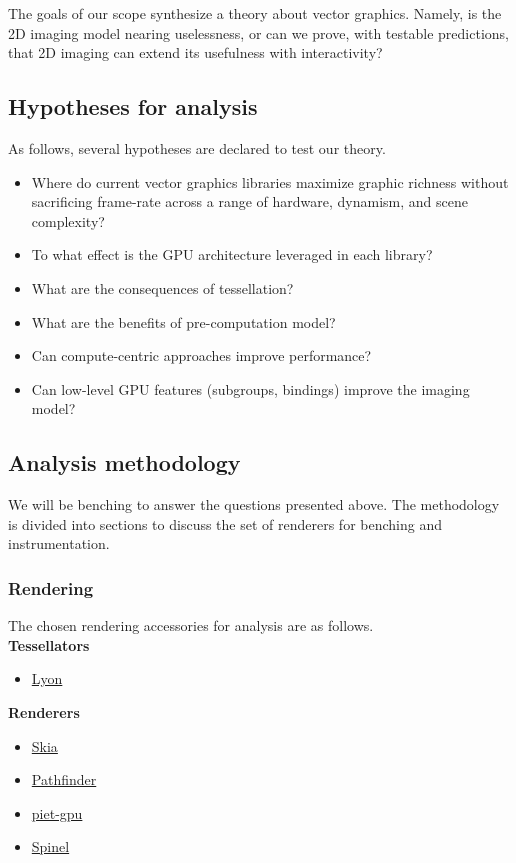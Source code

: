 The goals of our scope synthesize a theory about vector graphics. Namely, is the 2D imaging model nearing uselessness, or can we prove, with testable predictions, that 2D imaging can extend its usefulness with interactivity?

\subsection{Hypotheses for analysis}

As follows, several hypotheses are declared to test our theory.
\begin{itemize}
  \item Where do current vector graphics libraries maximize graphic richness without sacrificing frame-rate across a range of hardware, dynamism, and scene complexity?
  \item To what effect is the GPU architecture leveraged in each library?
  \item What are the consequences of tessellation?
  \item What are the benefits of pre-computation model?
  \item Can compute-centric approaches improve performance?
  \item Can low-level GPU features (subgroups, bindings) improve the imaging model?
\end{itemize}

\subsection{Analysis methodology}

We will be benching to answer the questions presented above. The methodology is divided into sections to discuss the set of renderers for benching and instrumentation.

\subsubsection{Rendering}

The chosen rendering accessories for analysis are as follows.\\

\textbf{Tessellators}
\begin{itemize}
  \item \href{https://github.com/nical/lyon}{Lyon}
\end{itemize}

\textbf{Renderers}
\begin{itemize}
  \item \href{https://skia.googlesource.com/skia}{Skia}
  \item \href{https://github.com/servo/pathfinder}{Pathfinder}
  \item \href{https://github.com/linebender/piet-gpu}{piet-gpu}
  \item \href{https://fuchsia.googlesource.com/fuchsia/+/refs/heads/main/src/graphics/lib/compute/spinel/README.md}{Spinel}
\end{itemize}

